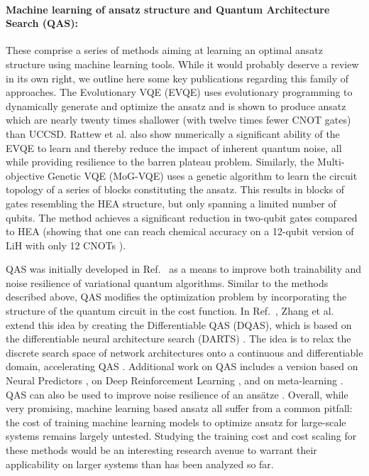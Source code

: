 \paragraph{Machine learning of ansatz structure and Quantum Architecture Search (QAS):} These comprise a series of methods aiming at learning an optimal ansatz structure using machine learning tools. While it would probably deserve a review in its own right, we outline here some key publications regarding this family of approaches. The Evolutionary VQE (EVQE) \cite{Rattew2019} uses evolutionary programming to dynamically generate and optimize the ansatz and is shown to produce ansatz which are nearly twenty times shallower (with twelve times fewer CNOT gates) than UCCSD. Rattew et al. \cite{Rattew2019} also show numerically a significant ability of the EVQE to learn and thereby reduce the impact of inherent quantum noise, all while providing resilience to the barren plateau problem. Similarly, the Multi-objective Genetic VQE (MoG-VQE) \cite{Chivilikhin2020} uses a genetic algorithm to learn the circuit topology of a series of blocks constituting the ansatz. This results in blocks of gates resembling the HEA structure, but only spanning a limited number of qubits. The method achieves a significant reduction in two-qubit gates compared to HEA (showing that one can reach chemical accuracy on a 12-qubit version of $\mathrm{LiH}$ with only 12 CNOTs \cite{Chivilikhin2020}). 

QAS was initially developed in Ref.~\cite{Du2020} as a means to improve both trainability and noise resilience of variational quantum algorithms. Similar to the methods described above, QAS modifies the optimization problem by incorporating the structure of the quantum circuit in the cost function. In Ref.~\cite{Zhang2020_QAS}, Zhang et al. extend this idea by creating the Differentiable QAS (DQAS), which is based on the differentiable neural architecture search (DARTS) \cite{Liu2018}. The idea is to relax the discrete search space of network architectures onto a continuous and differentiable domain, accelerating QAS \cite{Zhang2020_QAS}. Additional work on QAS includes a version based on Neural Predictors \cite{Zhang2021_QAS}, on Deep Reinforcement Learning \cite{Kuo2021}, and on meta-learning \cite{Chen2021_QAS}. QAS can also be used to improve noise resilience of an ans\"atze \cite{Wang2021_QAS}.
Overall, while very promising, machine learning based ansatz all suffer from a common pitfall: the cost of training machine learning models to optimize ansatz for large-scale systems remains largely untested. Studying the training cost and cost scaling for these methods would be an interesting research avenue to warrant their applicability on larger systems than has been analyzed so far. 

